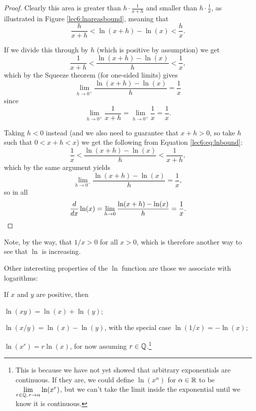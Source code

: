 \begin{proof}
	Clearly this area is greater than $h \cdot \frac{1}{x + h}$ and smaller than $h \cdot \frac{1}{x}$, as illustrated in Figure \ref{lec6:lnareasbound}, meaning that
	\begin{equation}\label{lec6:eq:lnbound}
		\frac{h}{x + h} < \ln(x + h) - \ln(x) < \frac{h}{x}.
	\end{equation}

	\noindent
	If we divide this through by $h$ (which is positive by assumption) we get
	\[
		\frac{1}{x + h} < \frac{\ln(x + h) - \ln(x)}{h} < \frac{1}{x},
	\]
	which by the Squeeze theorem (for one-sided limits) gives
	\[
		\lim_{h \to 0^+} \frac{\ln(x + h) - \ln(x)}{h} = \frac{1}{x}
	\]
	since
	\[
		\lim_{h \to 0^+} \frac{1}{x + h} = \lim_{h \to 0^+} \frac{1}{x} = \frac{1}{x}.
	\]

	\noindent
	Taking $h < 0$ instead (and we also need to guarantee that $x + h > 0$, so take $h$ such that $0 < x + h < x$) we get the following from Equation \eqref{lec6:eq:lnbound}:
	\[
		\frac{1}{x} < \frac{\ln(x + h) - \ln(x)}{h} < \frac{1}{x + h},
	\]
	which by the same argument yields
	\[
		\lim_{h \to 0^-} \frac{\ln(x + h) - \ln(x)}{h} = \frac{1}{x},
	\]
	so in all
	\[
		\frac{d}{d x} \ln(x) = \lim_{h \to 0} \frac{\ln(x + h) - \ln(x)}{h} = \frac{1}{x}. \qedhere
	\]
\end{proof}

\noindent
Note, by the way, that $1 / x > 0$ for all $x > 0$, which is therefore another way to see that $\ln$ is increasing.

Other interesting properties of the $\ln$ function are those we associate with logarithms:

\begin{theorem}
	If $x$ and $y$ are positive, then
	\begin{romanlist}
		\item $\ln(x y) = \ln(x) + \ln(y)$;
		\item $\ln(x / y) = \ln(x) - \ln(y)$, with the special case $\ln(1 / x) = - \ln(x)$;
		\item $\ln(x^r) = r \ln(x)$, for now assuming $r \in \mathbb{Q}$.\footnote{This is because we have not yet showed that arbitrary exponentials are continuous. If they are, we could define $\ln(x^\alpha)$ for $\alpha \in \mathbb{R}$ to be $\lim\limits_{r \in \mathbb{Q},\, r \to \alpha} \ln(x^r)$, but we can't take the limit inside the exponential until we know it is continuous.}
	\end{romanlist}
\end{theorem}

